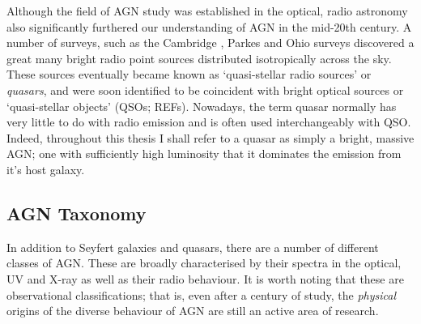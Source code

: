 Although the field of AGN study was established in the optical, 
radio astronomy also significantly furthered our understanding of AGN
in the mid-20th century. A number of surveys, such as the Cambridge \citep{edge1959}, 
Parkes \citep{ekers1969} and Ohio \citep{ehman1970} surveys discovered a great many 
bright radio point sources distributed isotropically across the sky.
These sources eventually became known as `quasi-stellar radio sources'
or {\em quasars}, and were soon identified to be coincident with bright optical
sources or `quasi-stellar objects' (QSOs; REFs). 
Nowadays, the term quasar normally has very little to do with 
radio emission and is often used interchangeably with QSO. 
Indeed, throughout this thesis I shall refer to a quasar as simply a bright, 
massive AGN; one with sufficiently high luminosity that it dominates the emission 
from it's host galaxy.

\subsection{AGN Taxonomy}
\label{sec:agn_taxonomy}

In addition to Seyfert galaxies and quasars, there are a number of 
different classes of AGN. These are broadly characterised by their spectra in the 
optical, UV and X-ray as well as their radio behaviour. It is worth noting
that these are observational classifications; that is, even after a century
of study, the {\em physical} origins of the diverse behaviour of AGN
are still an active area of research.

